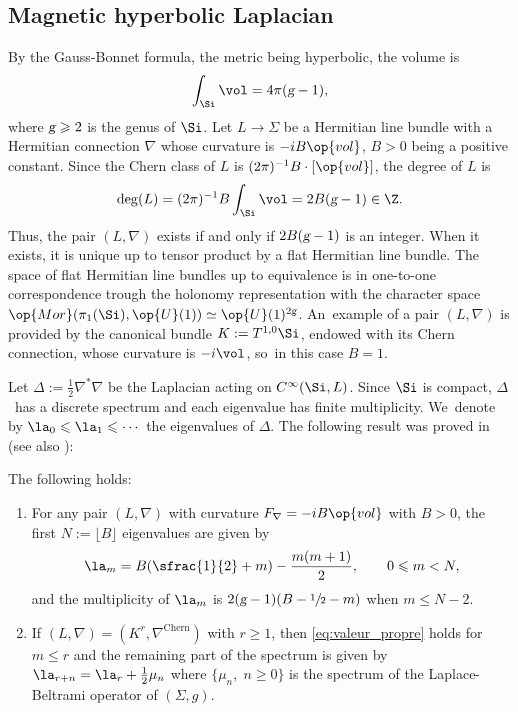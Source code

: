 \subsection{Magnetic hyperbolic Laplacian} \label{ssection:landau} By the Gauss-Bonnet formula, the metric being
hyperbolic, the volume is
\begin{equation}
\int_{\Si} \vol = 4 \pi (\textsl{g} -1),
\end{equation}
where $\textsl{g}\geqslant
2 $ is the genus of $\Si$. Let $L \to \Sigma$ be a Hermitian line bundle with
a Hermitian connection
$\nabla$ whose curvature is $-i B \op{vol}
$, $B > 0$ being a positive constant. Since the Chern class of $L$ is $ (2
\pi)^{-1} B \cdot [ \op{vol}]$, the
degree of $L$ is
\begin{equation}
\label{equation:deg}
\mathrm{deg}(L) = (2 \pi)^{-1} B \int_{\Si} \vol = 2 B (\textsl{g}-1) \in \Z.
\end{equation}
Thus, the pair $(L,
\nabla)$ exists if and only if $2 B (\textsl{g}-1)$ is an integer. When it exists, it
is unique up to tensor product by a flat Hermitian line bundle. The
space of flat Hermitian line bundles up to equivalence is in one-to-one
correspondence trough the holonomy representation with the character space
$\op{Mor} (\pi_1 (\Si), \op{U}(1)) \simeq \op{U} (1)^{2\textsl{g}}$. An~example of a pair $(L, \nabla)$ is provided by the canonical bundle $K := T^{1,0} \Si$,
endowed with its Chern connection, whose curvature is $- i \vol$, so~in this
case $B=1$.

Let $\Delta := \frac{1}{2} \nabla^* \nabla $ be the Laplacian acting on $C^\infty
(\Si, L)$. Since $\Si$ is compact, $\Delta$~has a discrete spectrum and each
eigenvalue has finite multiplicity. We~denote by $\la_0 \leqslant \la_1
\leqslant \cdots $ the eigenvalues of $\Delta$. The following result was
proved in \cite{Iengo-Li-94} (see also \cite{Tejero-06, Landau2}):

\begin{proposition} \label{theo:Landau_Level}
The following holds:
\begin{enumerate}

\item For any pair $(L, \nabla)$ with curvature $F_\nabla=-iB
\op{vol}$ with $B>0$, the first $N := \lfloor B \rfloor $ eigenvalues are
given by
\begin{gather} \label{eq:valeur_propre}
\la_{m } = B (\sfrac{1}{2} + m) - \dfrac{ m (m+1) } {2},\qquad 0
\leqslant m < N,
\end{gather}
and the multiplicity of $\la_m$ is $2 (\textsl{g}-1)(B-\sfrac{1}{2} - m)$ when $m \leqslant N- 2$.

\item If $(L,\nabla) = (K^r,\nabla^{\mathrm{Chern}})$ with $ r \geq 1$, then \eqref{eq:valeur_propre} holds for
$m \leqslant r$ and the remaining part of the spectrum is given by
$\la_{r+n} = \la_r + \frac{1}{2} \mu_n$ where $\{ \mu_n, \; n \geq 0 \}$ is the
spectrum of the Laplace-Beltrami operator of $(\Sigma, g)$.
\end{enumerate}
\end{proposition}

